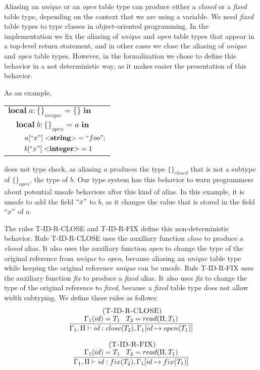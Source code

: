 \documentclass[preprint]{sigplanconf}
\newcommand{\Integer}{\mathbf{integer}}
\newcommand{\String}{\mathbf{string}}
\newcommand{\mylabel}[1]{\; (\textsc{#1})}
\newcommand{\env}{\Gamma}
\newcommand{\penv}{\Pi}
\begin{document}
Aliasing an \emph{unique} or an \emph{open} table type can produce
either a \emph{closed} or a \emph{fixed} table type, depending on
the context that we are using a variable.
We need \emph{fixed} table types to type classes in object-oriented programming.
In the implementation we fix the aliasing of \emph{unique} and \emph{open}
table types that appear in a top-level return statement, and in other cases we
close the aliasing of \emph{unique} and \emph{open} table types.
However, in the formalization we chose to define this behavior in
a not deterministic way, as it makes easier the presentation of this behavior.

As an example,
\begin{center}
\begin{tabular}{lll}
\multicolumn{3}{l}{$\mathbf{local} \; a:\{\}_{unique} = \{\} \; \mathbf{in}$}\\
& \multicolumn{2}{l}{$\mathbf{local} \; b:\{\}_{open} = a \; \mathbf{in}$}\\
& & \multicolumn{1}{l}{$a[``x"] \; {<}\String{>} = ``foo";$}\\
& & \multicolumn{1}{l}{$b[``x"] \; {<}\Integer{>} = 1$}\\
\end{tabular}
\end{center}
does not type check, as aliasing $a$ produces the type $\{\}_{closed}$
that is not a subtype of $\{\}_{open}$, the type of $b$.
Our type system has this behavior to warn programmers about
potential unsafe behaviors after this kind of alias.
In this example, it is unsafe to add the field $``x"$ to $b$,
as it changes the value that is stored in the field $``x"$ of $a$.

The rules \textsc{T-ID-R-CLOSE} and \textsc{T-ID-R-FIX} define this non-deterministic behavior.
Rule \textsc{T-ID-R-CLOSE} uses the auxiliary function \emph{close} to
produce a \emph{closed} alias.
It also uses the auxiliary function \emph{open} to change the type of
the original reference from \emph{unique} to \emph{open},
because aliasing an \emph{unique} table type while keeping the original
reference \emph{unique} can be unsafe.
Rule \textsc{T-ID-R-FIX} uses the auxiliary function \emph{fix} to
produce a \emph{fixed} alias.
It also uses \emph{fix} to change the type of the original reference
to \emph{fixed}, because a \emph{fixed} table type does not allow
width subtyping.
We define these rules as follows:
\[
\begin{array}{c}
\begin{array}{c}
\mylabel{T-ID-R-CLOSE}\\
\dfrac{\env_{1}(id) = T_{1} \;\;\; T_{2} = read(\penv, T_{1})}
      {\env_{1}, \penv \vdash id:close(T_{2}), \env_{1}[id \mapsto open(T_{1})]}
\end{array}
\\ \\
\begin{array}{c}
\mylabel{T-ID-R-FIX}\\
\dfrac{\env_{1}(id) = T_{1} \;\;\; T_{2} = read(\penv, T_{1})}
      {\env_{1}, \penv \vdash id:fix(T_{2}), \env_{1}[id \mapsto fix(T_{1})]}
\end{array}
\end{array}
\]
\end{document}

